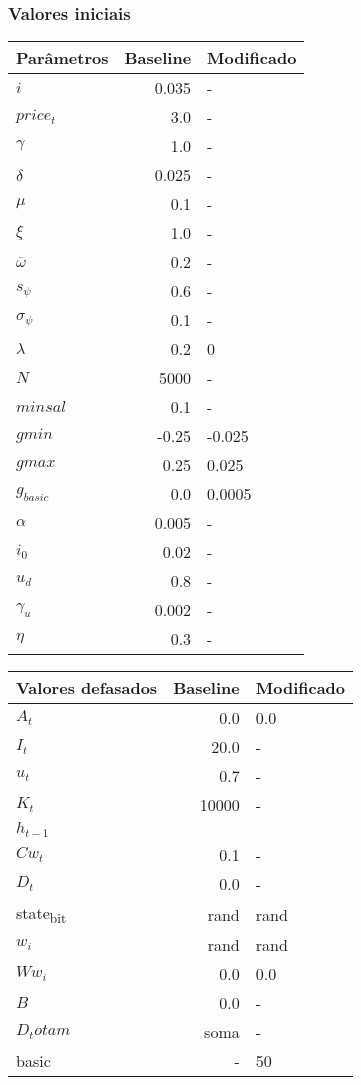 \documentclass[11pt]{article}
\begin{document}
\subsubsection{Valores iniciais}
\label{sec:org3be1370}

\begin{center}
\begin{tabular}{lrl}
Parâmetros & Baseline & Modificado\\
\hline
\(i\) & 0.035 & -\\
\(price_t\) & 3.0 & -\\
\(\gamma\) & 1.0 & -\\
\(\delta\) & 0.025 & -\\
\(\mu\) & 0.1 & -\\
\(\xi\) & 1.0 & -\\
\(\overline \omega\) & 0.2 & -\\
\(s_\psi\) & 0.6 & -\\
\(\sigma_\psi\) & 0.1 & -\\
\(\lambda\) & 0.2 & 0\\
\(N\) & 5000 & -\\
\(minsal\) & 0.1 & -\\
\(gmin\) & -0.25 & -0.025\\
\(gmax\) & 0.25 & 0.025\\
\(g_{basic}\) & 0.0 & 0.0005\\
\(\alpha\) & 0.005 & -\\
\(i_0\) & 0.02 & -\\
\(u_d\) & 0.8 & -\\
\(\gamma_u\) & 0.002 & -\\
\(\eta\) & 0.3 & -\\
\end{tabular}
\end{center}


\begin{center}
\begin{tabular}{lrl}
Valores defasados & Baseline & Modificado\\
\hline
\(A_t\) & 0.0 & 0.0\\
\(I_t\) & 20.0 & -\\
\(u_t\) & 0.7 & -\\
\(K_t\) & 10000 & -\\
\(h_{t-1}\) &  & \\
\(Cw_t\) & 0.1 & -\\
\(D_t\) & 0.0 & -\\
state\textsubscript{b}\textsubscript{it} & rand & rand\\
\(w_i\) & rand & rand\\
\(Ww_i\) & 0.0 & 0.0\\
\(B\) & 0.0 & -\\
\(D_totam\) & soma & -\\
basic & - & 50\\
\end{tabular}
\end{center}
\end{document}
